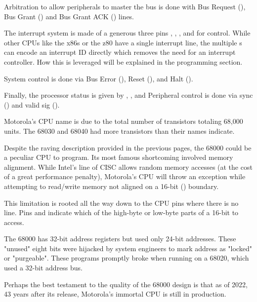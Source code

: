 Arbitration to allow peripherals to master the bus is done with Bus Request (),  Bus Grant () and Bus Grant ACK () lines.

The interrupt system is made of a generous three pins , , , and  for control. While other CPUs like the x86s or the z80 have a single interrupt line, the multiple s can encode an interrupt ID directly which removes the need for an interrupt controller. How this is leveraged will be explained in the programming section.

System control is done via Bus Error (), Reset (), and Halt (). 

Finally, the processor status is given by , ,  and Peripheral control is done via sync () and valid sig ().

\begin{trivia}
Motorola's CPU name is due to the total number of transistors totaling 68,000 units. The 68030 and 68040 had more transistors than their names indicate. 
\end{trivia}

Despite the raving description provided in the previous pages, the 68000 could be a peculiar CPU to program. Its most famous shortcoming involved memory alignment. While Intel's line of CISC allows random memory accesses (at the cost of a great performance penalty), Motorola's CPU will throw an  exception while attempting to read/write memory not aligned on a 16-bit () boundary.

This limitation is rooted all the way down to the CPU pins where there is no  line. Pins  and indicate which of the high-byte or low-byte parts of a 16-bit  to access.


\begin{trivia}
 The 68000 has 32-bit address registers but used only 24-bit addresses. These "unused" eight bits were hijacked by system engineers to mark address as "locked" or "purgeable". These programs promptly broke when running on a 68020, which used a 32-bit address bus. 
\end{trivia}

Perhaps the best testament to the quality of the 68000 design is that as of 2022, 43 years after its release, Motorola's immortal CPU is still in production.


